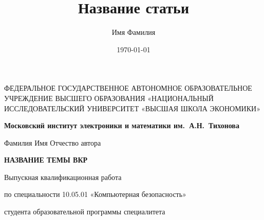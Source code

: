 \documentclass[a4paper,12pt]{report}
\author{Имя Фамилия}
\title{Название статьи}
\date{\today}
\begin{document}
\thispagestyle{empty}
\begin{center}
\sc
ФЕДЕРАЛЬНОЕ  ГОСУДАРСТВЕННОЕ АВТОНОМНОЕ
ОБРАЗОВАТЕЛЬНОЕ УЧРЕЖДЕНИЕ ВЫСШЕГО ОБРАЗОВАНИЯ
«НАЦИОНАЛЬНЫЙ ИССЛЕДОВАТЕЛЬСКИЙ УНИВЕРСИТЕТ
«ВЫСШАЯ ШКОЛА ЭКОНОМИКИ»
\end{center}

\begin{center}
\bf Московский институт электроники и математики им.~А.Н.~Тихонова
\end{center}

\vspace{1cm}

\begin{center}
Фамилия Имя Отчество автора
\end{center}

\vspace{1cm}

\begin{center}
\bf НАЗВАНИЕ ТЕМЫ ВКР
\end{center}

\vspace{1cm}

\begin{center}
Выпускная квалификационная работа \par
по специальности 10.05.01 «Компьютерная безопасность» \par
студента образовательной программы специалитета
\end{center}

\vfill
\end{document}
